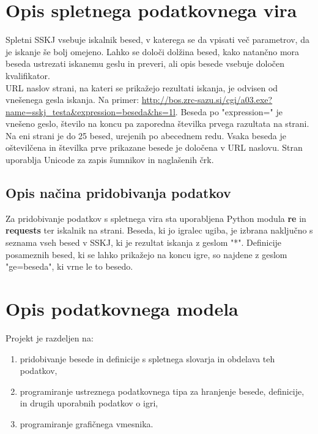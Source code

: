 \documentclass [a4paper, 12pt] {article}
\begin{document}
\section {Opis spletnega podatkovnega vira}
Spletni SSKJ vsebuje iskalnik besed, v katerega se da vpisati več parametrov, da je iskanje še bolj omejeno. Lahko se določi dolžina besed, kako natančno mora beseda ustrezati iskanemu geslu in preveri, ali opis besede vsebuje določen kvalifikator. \\
 URL naslov strani, na kateri se prikažejo rezultati iskanja, je odvisen od vnešenega gesla iskanja. Na primer: \url {http://bos.zrc-sazu.si/cgi/a03.exe?name=sskj_testa&expression=beseda&hs=1l}. Beseda po "expression=" je vnešeno geslo, število na koncu pa zaporedna številka prvega razultata na strani. \\
Na eni strani je do 25 besed, urejenih po abecednem redu. Vsaka beseda je oštevilčena in številka prve prikazane besede je določena v URL naslovu. Stran uporablja Unicode za zapis šumnikov in naglašenih črk.
\subsection {Opis načina pridobivanja podatkov}
Za pridobivanje podatkov s spletnega vira sta uporabljena Python modula \textbf {re} in \textbf {requests} ter iskalnik na strani. Beseda, ki jo igralec ugiba, je izbrana naključno s seznama vseh besed v SSKJ, ki je rezultat iskanja z geslom "*". Definicije posameznih besed, ki se lahko prikažejo na koncu igre, so najdene z geslom "ge=beseda", ki vrne le to besedo.


\section {Opis podatkovnega modela}
Projekt je razdeljen na:
\begin {enumerate}
\item pridobivanje besede in definicije s spletnega slovarja in obdelava teh podatkov,
\item programiranje ustreznega podatkovnega tipa za hranjenje besede, definicije, in drugih uporabnih podatkov o igri,
\item programiranje grafičnega vmesnika.
\end {enumerate}
\end{document}
